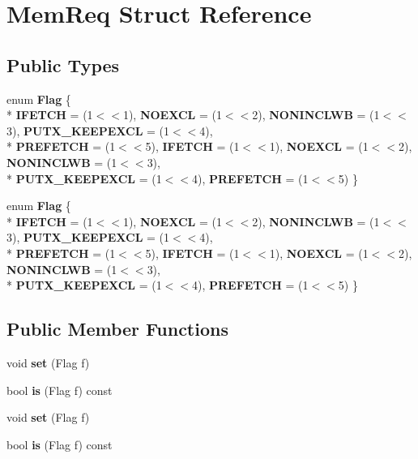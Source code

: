 \hypertarget{structMemReq}{\section{Mem\-Req Struct Reference}
\label{structMemReq}
}
\subsection*{Public Types}
\begin{DoxyCompactItemize}
\item 
enum {\bfseries Flag} \{ \\*
{\bfseries I\-F\-E\-T\-C\-H} = (1$<$$<$1), 
{\bfseries N\-O\-E\-X\-C\-L} = (1$<$$<$2), 
{\bfseries N\-O\-N\-I\-N\-C\-L\-W\-B} = (1$<$$<$3), 
{\bfseries P\-U\-T\-X\-\_\-\-K\-E\-E\-P\-E\-X\-C\-L} = (1$<$$<$4), 
\\*
{\bfseries P\-R\-E\-F\-E\-T\-C\-H} = (1$<$$<$5), 
{\bfseries I\-F\-E\-T\-C\-H} = (1$<$$<$1), 
{\bfseries N\-O\-E\-X\-C\-L} = (1$<$$<$2), 
{\bfseries N\-O\-N\-I\-N\-C\-L\-W\-B} = (1$<$$<$3), 
\\*
{\bfseries P\-U\-T\-X\-\_\-\-K\-E\-E\-P\-E\-X\-C\-L} = (1$<$$<$4), 
{\bfseries P\-R\-E\-F\-E\-T\-C\-H} = (1$<$$<$5)
 \}
\item 
enum {\bfseries Flag} \{ \\*
{\bfseries I\-F\-E\-T\-C\-H} = (1$<$$<$1), 
{\bfseries N\-O\-E\-X\-C\-L} = (1$<$$<$2), 
{\bfseries N\-O\-N\-I\-N\-C\-L\-W\-B} = (1$<$$<$3), 
{\bfseries P\-U\-T\-X\-\_\-\-K\-E\-E\-P\-E\-X\-C\-L} = (1$<$$<$4), 
\\*
{\bfseries P\-R\-E\-F\-E\-T\-C\-H} = (1$<$$<$5), 
{\bfseries I\-F\-E\-T\-C\-H} = (1$<$$<$1), 
{\bfseries N\-O\-E\-X\-C\-L} = (1$<$$<$2), 
{\bfseries N\-O\-N\-I\-N\-C\-L\-W\-B} = (1$<$$<$3), 
\\*
{\bfseries P\-U\-T\-X\-\_\-\-K\-E\-E\-P\-E\-X\-C\-L} = (1$<$$<$4), 
{\bfseries P\-R\-E\-F\-E\-T\-C\-H} = (1$<$$<$5)
 \}
\end{DoxyCompactItemize}
\subsection*{Public Member Functions}
\begin{DoxyCompactItemize}
\item 
\hypertarget{structMemReq_a6abc9d7241b7121769a0c71dd93a2a5d}{void {\bfseries set} (Flag f)}\label{structMemReq_a6abc9d7241b7121769a0c71dd93a2a5d}

\item 
\hypertarget{structMemReq_a89e64e069e7f28fe1c705636286a1efc}{bool {\bfseries is} (Flag f) const }\label{structMemReq_a89e64e069e7f28fe1c705636286a1efc}

\item 
\hypertarget{structMemReq_a6abc9d7241b7121769a0c71dd93a2a5d}{void {\bfseries set} (Flag f)}\label{structMemReq_a6abc9d7241b7121769a0c71dd93a2a5d}

\item 
\hypertarget{structMemReq_a89e64e069e7f28fe1c705636286a1efc}{bool {\bfseries is} (Flag f) const }\label{structMemReq_a89e64e069e7f28fe1c705636286a1efc}

\end{DoxyCompactItemize}
